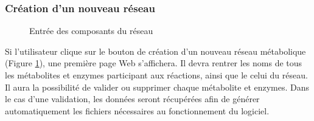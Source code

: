 \pagebreak	
			
\subsubsection{Création d'un nouveau réseau}

\begin{figure}[!ht]
	\begin{center}
		\caption{Entrée des composants du réseau}
  		\label{reseau}
  	\end{center}	
\end{figure}

Si l'utilisateur clique sur le bouton de création d'un nouveau réseau métabolique (Figure \ref{reseau}), une première page Web s'affichera. Il devra rentrer les noms de tous les métabolites et enzymes participant aux réactions, ainsi que le celui du réseau. Il aura la possibilité de valider ou supprimer chaque métabolite et enzymes. Dans le cas d'une validation, les données seront récupérées afin de générer automatiquement les fichiers nécessaires au fonctionnement du logiciel.

\pagebreak

